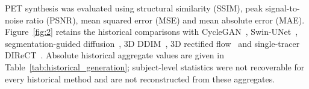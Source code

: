 PET synthesis was evaluated using structural similarity (SSIM), peak signal-to-noise ratio (PSNR), mean squared error (MSE) and mean absolute error (MAE). Figure~\ref{fig:2} retains the historical comparisons with CycleGAN~\cite{zhu2017unpaired}, Swin-UNet~\cite{Cao2021swin}, segmentation-guided diffusion~\cite{konz2024anatomically}, 3D DDIM~\cite{song2021ddim,pinaya2023generative}, 3D rectified flow~\cite{Xing2022} and single-tracer DIReCT~\cite{liu2025direct}. Absolute historical aggregate values are given in Table~\ref{tab:historical_generation}; subject-level statistics were not recoverable for every historical method and are not reconstructed from these aggregates.
